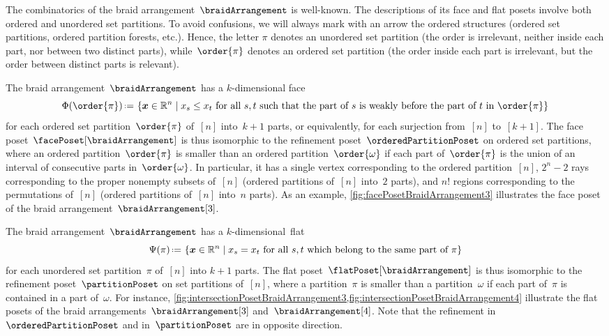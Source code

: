 \documentclass{amsart}
\theoremstyle{definition}
\newcommand{\R}{\mathbb{R}} %
\renewcommand{\b}[1]{{\boldsymbol{#1}}} %
\newcommand{\set}[2]{\left\{ #1 \;\middle|\; #2 \right\}} %
\newcommand{\eqdef}{\mbox{\,\raisebox{0.2ex}{\scriptsize\ensuremath{\mathrm:}}\ensuremath{=}\,}} %
\renewcommand{\b}[1]{\boldsymbol{#1}} %
\begin{document}
The combinatorics of the braid arrangement~$\braidArrangement$ is well-known.
The descriptions of its face and flat posets involve both ordered and unordered set partitions.
To avoid confusions, we will always mark with an arrow the ordered structures (ordered set partitions, ordered partition forests, etc.).
Hence, the letter $\pi$ denotes an unordered set partition (the order is irrelevant, neither inside each part, nor between two distinct parts), while~$\order{\pi}$ denotes an ordered set partition (the order inside each part is irrelevant, but the order between distinct parts is relevant).

The braid arrangement~$\braidArrangement$ has a $k$-dimensional face
\[
\Phi(\order{\pi}) \eqdef \set{\b{x} \in \R^n}{x_s \le x_t \text{ for all $s,t$ such that the part of~$s$ is weakly before the part of~$t$ in $\order{\pi}$}}
\]
for each ordered set partition~$\order{\pi}$ of~$[n]$ into~$k+1$ parts, or equivalently, for each surjection from~$[n]$ to~$[k+1]$.
The face poset~$\facePoset[\braidArrangement]$ is thus isomorphic to the refinement poset~$\orderedPartitionPoset$ on ordered set partitions, where an ordered partition~$\order{\pi}$ is smaller than an ordered partition~$\order{\omega}$ if each part of~$\order{\pi}$ is the union of an interval of consecutive parts in~$\order{\omega}$.
In particular, it has a single vertex corresponding to the ordered partition~$[n]$, $2^n-2$ rays corresponding to the proper nonempty subsets of~$[n]$ (ordered partitions of~$[n]$ into~$2$ parts), and $n!$ regions corresponding to the permutations of~$[n]$ (ordered partitions of~$[n]$ into~$n$ parts).
As an example, \cref{fig:facePosetBraidArrangement3} illustrates the face poset of the braid arrangement~$\braidArrangement[3]$.

The braid arrangement~$\braidArrangement$ has a $k$-dimensional~flat
\[
\Psi(\pi) \eqdef \set{\b{x} \in \R^n}{x_s = x_t \text{ for all  $s, t$ which belong to the same part of~$\pi$}}
\]
for each unordered set partition~$\pi$ of~$[n]$ into $k+1$ parts.
The flat poset~$\flatPoset[\braidArrangement]$ is thus isomorphic to the refinement poset~$\partitionPoset$ on set partitions of~$[n]$, where a partition~$\pi$ is smaller than a partition~$\omega$ if each part of~$\pi$ is contained in a part of~$\omega$.
For instance, \cref{fig:intersectionPosetBraidArrangement3,fig:intersectionPosetBraidArrangement4} illustrate the flat posets of the braid arrangements~$\braidArrangement[3]$ and~$\braidArrangement[4]$.
Note that the refinement in~$\orderedPartitionPoset$ and in~$\partitionPoset$ are in opposite direction.
\end{document}
